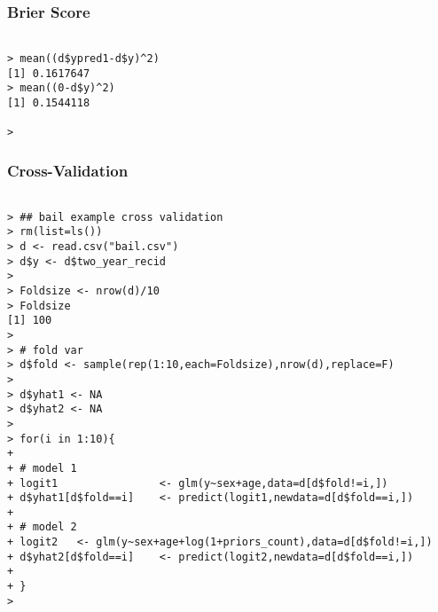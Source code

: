 \documentclass[xcolor=dvipsnames]{beamer}
\begin{document}
\begin{frame}[fragile]
\frametitle{Brier Score}
\begin{Verbatim}[fontsize=\tiny, frame=single, label=R Code]

> mean((d$ypred1-d$y)^2)
[1] 0.1617647
> mean((0-d$y)^2)
[1] 0.1544118

> \end{Verbatim}
\end{frame}





\begin{frame}[fragile]
\frametitle{Cross-Validation}
\begin{Verbatim}[fontsize=\tiny, frame=single, label=R Code]

> ## bail example cross validation  
> rm(list=ls())
> d <- read.csv("bail.csv")
> d$y <- d$two_year_recid
> 
> Foldsize <- nrow(d)/10
> Foldsize
[1] 100
> 
> # fold var
> d$fold <- sample(rep(1:10,each=Foldsize),nrow(d),replace=F)
> 
> d$yhat1 <- NA
> d$yhat2 <- NA
> 
> for(i in 1:10){
+ 
+ # model 1 
+ logit1                <- glm(y~sex+age,data=d[d$fold!=i,])
+ d$yhat1[d$fold==i]    <- predict(logit1,newdata=d[d$fold==i,])
+ 
+ # model 2
+ logit2   <- glm(y~sex+age+log(1+priors_count),data=d[d$fold!=i,])
+ d$yhat2[d$fold==i]    <- predict(logit2,newdata=d[d$fold==i,])
+ 
+ }
> \end{Verbatim}
\end{frame}
\end{document}
